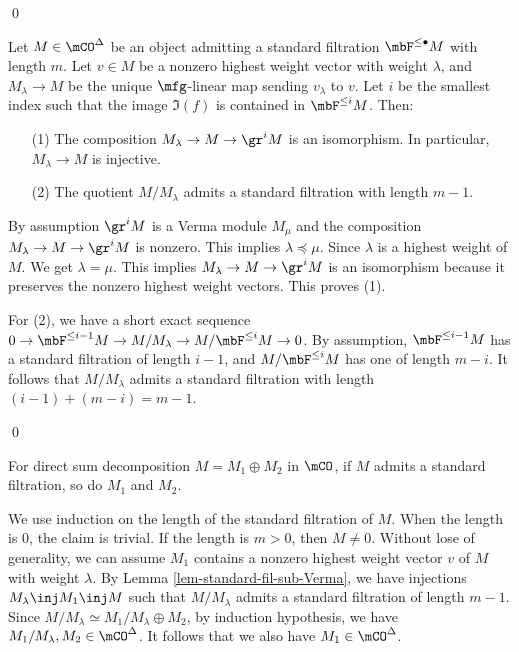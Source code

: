 	\qed

	\begin{lem}
		\label{lem-standard-fil-sub-Verma}
		 Let $M\in \mCO^\Delta$ be an object admitting a standard filtration $\mbF^{\le \bullet}M$ with length $m$. Let $v\in M$ be a nonzero highest weight vector with weight $\lambda$, and $M_\lambda \to M$ be the unique $\mfg$-linear map sending $v_\lambda$ to $v$. Let $i$ be the smallest index such that the image $\Im(f)$ is contained in $\mbF^{\le i}M$. Then:
		\begin{itemize}
			\item[(1)]
				The composition $M_\lambda \to M \to \gr^i M$ is an isomorphism. In particular, $M_\lambda \to M$ is injective.
			\item[(2)]
				The quotient $M/M_\lambda$ admits a standard filtration with length $m-1$.
		\end{itemize}
	\end{lem}

	\proof
		By assumption $\gr^i M$ is a Verma module $M_\mu$ and the composition $M_\lambda \to M \to \gr^i M$ is nonzero. This implies $\lambda\preceq \mu$. Since $\lambda$ is a highest weight of $M$. We get $\lambda= \mu$. This implies $M_\lambda \to M \to \gr^i M$ is an isomorphism because it preserves the nonzero highest weight vectors. This proves (1).

		For (2), we have a short exact sequence $0 \to \mbF^{\le i-1} M \to M/M_\lambda \to M/\mbF^{\le i}M \to 0$. By assumption, $\mbF^{\le i-1} M$ has a standard filtration of length $i-1$, and $M/\mbF^{\le i}M $ has one of length $m-i$. It follows that $M/M_\lambda$ admits a standard filtration with length $(i-1)+(m-i)=m-1$.

	\qed

	\begin{lem}
		\label{lem-direct-summand-standard-fil}
		For direct sum decomposition $M=M_1\oplus M_2$ in $\mCO$, if $M$ admits a standard filtration, so do $M_1$ and $M_2$.
	\end{lem}

	\proof
		We use induction on the length of the standard filtration of $M$. When the length is $0$, the claim is trivial. If the length is $m>0$, then $M\neq 0$. Without lose of generality, we can assume $M_1$ contains a nonzero highest weight vector $v$ of $M$ with weight $\lambda$. By Lemma \ref{lem-standard-fil-sub-Verma}, we have injections $M_\lambda \inj M_1 \inj M$ such that $M/M_\lambda$ admits a standard filtration of length $m-1$. Since $M/M_\lambda \simeq M_1/M_\lambda \oplus M_2$, by induction hypothesis, we have $M_1/M_\lambda, M_2\in \mCO^\Delta$. It follows that we also have $M_1\in \mCO^\Delta$.

